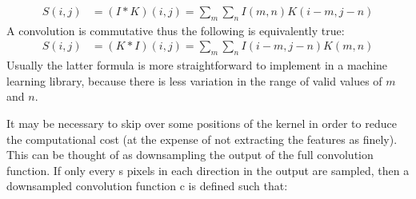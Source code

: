 \documentclass[book.tex]{subfiles}
\begin{document}
\begin{align}
S(i,j) &=(I*K)(i,j) = \sum_m \sum_n I(m,n)K(i-m,j-n)
\end{align}
A convolution is commutative thus the following is equivalently true:
\begin{align}
S(i,j) &= (K*I)(i,j)=\sum_m \sum_n I(i-m,j-n)K(m,n)
\end{align}
Usually the latter formula is more straightforward to implement in a machine learning library, because there is less variation in the range of valid values of $m$ and $n$.

It may be necessary to skip over some positions of the kernel in order to reduce the computational cost (at the expense of not extracting the features as finely). This can be thought of as downsampling the output of the full convolution function. If only every s pixels in each direction in the output are sampled, then a downsampled convolution function c is defined such that:
\end{document}
